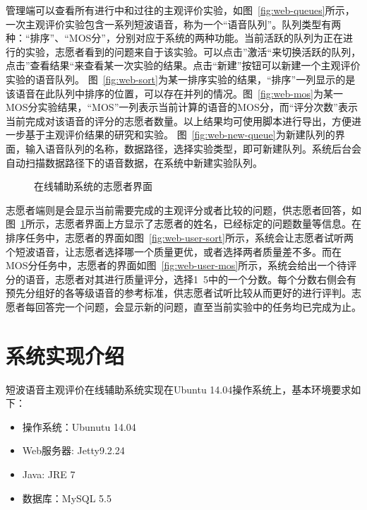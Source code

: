 管理端可以查看所有进行中和过往的主观评价实验，如图~\ref{fig:web-queues}所示，一次主观评价实验包含一系列短波语音，称为一个“语音队列”。队列类型有两种：“排序”、“MOS分”，分别对应于系统的两种功能。当前活跃的队列为正在进行的实验，志愿者看到的问题来自于该实验。可以点击”激活“来切换活跃的队列，点击”查看结果“来查看某一次实验的结果。点击“新建”按钮可以新建一个主观评价实验的语音队列。
图~\ref{fig:web-sort}为某一排序实验的结果，“排序”一列显示的是该语音在此队列中排序的位置，可以存在并列的情况。图~\ref{fig:web-mos}为某一MOS分实验结果，“MOS”一列表示当前计算的语音的MOS分，而“评分次数”表示当前完成对该语音的评分的志愿者数量。以上结果均可使用脚本进行导出，方便进一步基于主观评价结果的研究和实验。
图~\ref{fig:web-new-queue}为新建队列的界面，输入语音队列的名称，数据路径，选择实验类型，即可新建队列。系统后台会自动扫描数据路径下的语音数据，在系统中新建实验队列。

\begin{figure}
\centering
{}
\caption{在线辅助系统的志愿者界面\label{fig:web-user}}
\end{figure}

志愿者端则是会显示当前需要完成的主观评分或者比较的问题，供志愿者回答，如图~\ref{fig:web-user}所示，志愿者界面上方显示了志愿者的姓名，已经标定的问题数量等信息。在排序任务中，志愿者的界面如图~\ref{fig:web-user-sort}所示，系统会让志愿者试听两个短波语音，让志愿者选择哪一个质量更优，或者选择两者质量差不多。而在MOS分任务中，志愿者的界面如图~\ref{fig:web-user-mos}所示，系统会给出一个待评分的语音，志愿者对其进行质量评分，选择1~5中的一个分数。每个分数右侧会有预先分组好的各等级语音的参考标准，供志愿者试听比较从而更好的进行评判。志愿者每回答完一个问题，会显示新的问题，直至当前实验中的任务均已完成为止。

\section{系统实现介绍}

短波语音主观评价在线辅助系统实现在Ubuntu 14.04操作系统上，基本环境要求如下：
\begin{itemize}
    \item 操作系统：Ubunutu 14.04
    \item Web服务器: Jetty9.2.24
    \item Java: JRE 7
    \item 数据库：MySQL 5.5
\end{itemize}

